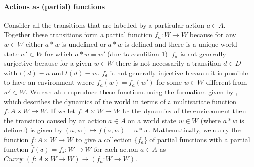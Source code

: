 \paragraph{Actions as (partial) functions}
Consider all the transitions that are labelled by a particular action $a \in A$.
Together these transitions form a partial function $f_{a}: W \to W$ because for any $w \in W$ either $a * w$ is undefined or $a * w$ is defined and there is a unique world state $w' \in W$ for which $a * w = w'$ (due to condition 1).
$f_{a}$ is not generally surjective because for a given $w \in W$ there is not necessarily a transition $d \in D$ with $l(d) = a$ and $t(d) = w$.
$f_{a}$ is not generally injective because it is possible to have an environment where $f_{a}(w)=f_{a}(w')$ for some $w \in W$ different from $w' \in W$.
We can also reproduce these functions using the formalism given by \cite{caselles2019symmetry}, which describes the dynamics of the world in terms of a multivariate function $f: A \times W \to W$.
If we let $f: A \times W \to W$ be the dynamics of the environment then the transition caused by an action $a \in A$ on a world state $w \in W$ (where $a * w$ is defined) is given by $(a,w) \mapsto f(a,w) = a * w$.
Mathematically, we curry the function $f: A \times W \to W$ to give a collection $\{f_{a}\}$ of partial functions with a partial function $\hat{f}(a)=f_{a}: W \to W$ for each action $a \in A$ as $\textit{Curry}: (f: A \times W \to W) \to (f_{a}: W \to W)$.
